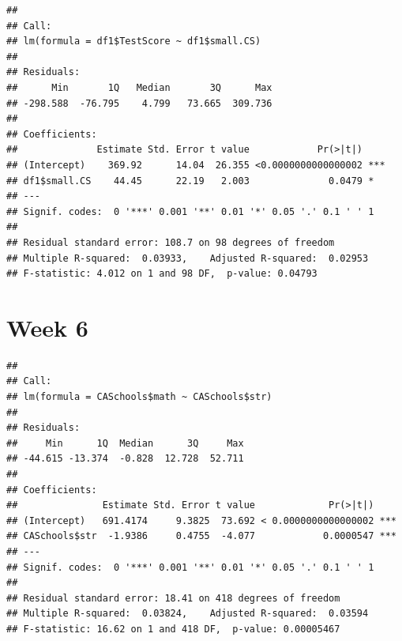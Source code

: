 \documentclass[
]{book}
\newenvironment{Shaded}{\begin{snugshade}}{\end{snugshade}}
\newcommand{\KeywordTok}[1]{\textcolor[rgb]{0.13,0.29,0.53}{\textbf{#1}}}
\newcommand{\NormalTok}[1]{#1}
\newcommand{\OperatorTok}[1]{\textcolor[rgb]{0.81,0.36,0.00}{\textbf{#1}}}
\newcommand{\StringTok}[1]{\textcolor[rgb]{0.31,0.60,0.02}{#1}}
\begin{document}
\begin{Shaded}
\end{Shaded}

\begin{verbatim}
## 
## Call:
## lm(formula = df1$TestScore ~ df1$small.CS)
## 
## Residuals:
##      Min       1Q   Median       3Q      Max 
## -298.588  -76.795    4.799   73.665  309.736 
## 
## Coefficients:
##              Estimate Std. Error t value            Pr(>|t|)    
## (Intercept)    369.92      14.04  26.355 <0.0000000000000002 ***
## df1$small.CS    44.45      22.19   2.003              0.0479 *  
## ---
## Signif. codes:  0 '***' 0.001 '**' 0.01 '*' 0.05 '.' 0.1 ' ' 1
## 
## Residual standard error: 108.7 on 98 degrees of freedom
## Multiple R-squared:  0.03933,    Adjusted R-squared:  0.02953 
## F-statistic: 4.012 on 1 and 98 DF,  p-value: 0.04793
\end{verbatim}

\hypertarget{week-6}{%
\section{Week 6}\label{week-6}}

\begin{Shaded}
\end{Shaded}

\begin{verbatim}
## 
## Call:
## lm(formula = CASchools$math ~ CASchools$str)
## 
## Residuals:
##     Min      1Q  Median      3Q     Max 
## -44.615 -13.374  -0.828  12.728  52.711 
## 
## Coefficients:
##               Estimate Std. Error t value             Pr(>|t|)    
## (Intercept)   691.4174     9.3825  73.692 < 0.0000000000000002 ***
## CASchools$str  -1.9386     0.4755  -4.077            0.0000547 ***
## ---
## Signif. codes:  0 '***' 0.001 '**' 0.01 '*' 0.05 '.' 0.1 ' ' 1
## 
## Residual standard error: 18.41 on 418 degrees of freedom
## Multiple R-squared:  0.03824,    Adjusted R-squared:  0.03594 
## F-statistic: 16.62 on 1 and 418 DF,  p-value: 0.00005467
\end{verbatim}
\end{document}
